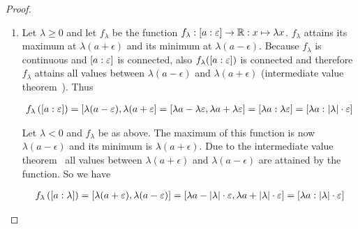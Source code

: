 \begin{proof}
\begin{enumerate}
    \item
      Let $\lambda \ge 0$ and let $f_\lambda$ be the function $f_\lambda : \an[\epsilon]{a}\to\R:x\mapsto \lambda x$. $f_\lambda$ attains its maximum at $\lambda(a+\epsilon)$ and its minimum at $\lambda(a-\epsilon)$. Because $f_\lambda$ is continuous and $\an[\epsilon]{a}$ is connected, also $f_\lambda(\an[\epsilon]{a})$ is connected and therefore $f_\lambda$ attains all values between $\lambda(a-\epsilon)$ and $\lambda(a+\epsilon)$ (intermediate value theorem~\cite{wiki:intermediatevaluetheorem}). Thus

      \begin{align}
        f_\lambda\left(\an[\epsilon]{a}\right) = \interval{\lambda(a-\epsilon)}{\lambda(a+\epsilon} = \interval{\lambda a - \lambda \epsilon}{\lambda a+\lambda \epsilon} = \an[\lambda \epsilon]{\lambda a} = \an[\abs{\lambda}\cdot \epsilon]{\lambda a}
      \end{align}

      Let $\lambda < 0$ and $f_\lambda$ be as above. The maximum of this function is now $\lambda (a-\epsilon)$ and its minimum is $\lambda (a+\epsilon)$. Due to the intermediate value theorem~\cite{wiki:intermediatevaluetheorem} all values between $\lambda(a+\epsilon)$ and $\lambda(a-\epsilon)$ are attained by the function. So we have

      \begin{align}
        f_\lambda\left(\an[\lambda]{a}\right) = \interval{\lambda(a+\epsilon)}{\lambda(a-\epsilon)} = \interval{\lambda a -\abs{\lambda}\cdot \epsilon}{\lambda a + \abs{\lambda}\cdot \epsilon} = \an[\abs{\lambda}\cdot \epsilon]{\lambda a}
      \end{align}

 \end{enumerate}
\end{proof}



